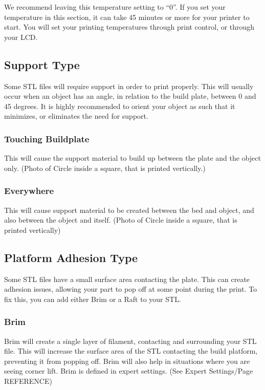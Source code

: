 We recommend leaving this temperature setting to “0”. If you set your temperature in this section, it can take 45 minutes or more for your printer to start. You will set your printing temperatures through print control, or through your LCD.

\subsection{Support Type}

Some STL files will require support in order to print properly. This will usually occur when an object has an angle, in relation to the build plate, between 0 and 45 degrees. It is highly recommended to orient your object as such that it minimizes, or eliminates the need for support.

\subsubsection{Touching Buildplate}

This will cause the support material to build up between the plate and the object only. (Photo of Circle inside a square, that is printed vertically.)

\subsubsection{Everywhere}

This will cause support material to be created between the bed and object, and also between the object and itself. (Photo of Circle inside a square, that is printed vertically)

\subsection{Platform Adhesion Type}

Some STL files have a small surface area contacting the plate. This can create adhesion issues, allowing your part to pop off at some point during the print. To fix this, you can add either Brim or a Raft to your STL.

\subsubsection{Brim}

Brim will create a single layer of filament, contacting and surrounding your STL file. This will increase the surface area of the STL contacting the build platform, preventing it from popping off. Brim will also help in situations where you are seeing corner lift. Brim is defined in expert settings. (See Expert Settings/Page REFERENCE)

